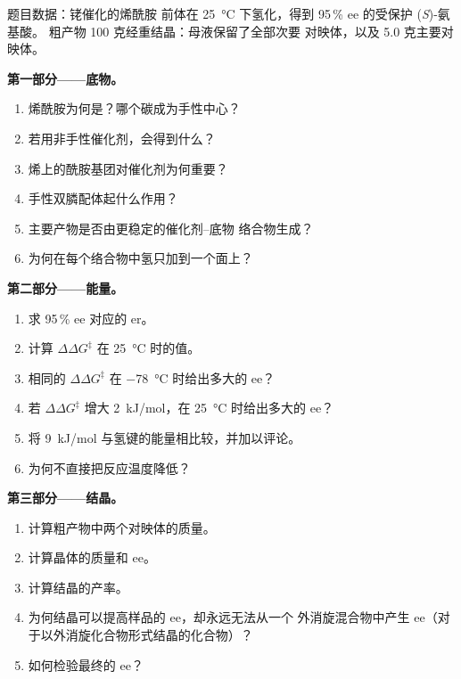 \begin{problem}
\label{pb:b3:asymmetric-synthesis:1}
题目数据：铑催化的烯酰胺
前体在 \qty{25}{\celsius} 下氢化，得到 95\,\% ee 的受保护 (\textit{S})-氨基酸。
粗产物 100 克经重结晶：母液保留了全部次要
对映体，以及 5.0 克主要对映体。

\medskip\noindent\textbf{第一部分——底物。}
\begin{enumerate}
  \item 烯酰胺为何是？哪个碳成为手性中心？
  \item 若用非手性催化剂，会得到什么？
  \item 烯上的酰胺基团对催化剂为何重要？
  \item 手性双膦配体起什么作用？
  \item 主要产物是否由更稳定的催化剂–底物
        络合物生成？
  \item 为何在每个络合物中氢只加到一个面上？
\end{enumerate}

\medskip\noindent\textbf{第二部分——能量。}
\begin{enumerate}[resume]
  \item 求 95\,\% ee 对应的 er。
  \item 计算 $\Delta\Delta G^\ddagger$ 在 \qty{25}{\celsius} 时的值。
  \item 相同的 $\Delta\Delta G^\ddagger$ 在 \qty{-78}{\celsius} 时给出多大的 ee？
  \item 若 $\Delta\Delta G^\ddagger$ 增大 \qty{2}{kJ/mol}，在 \qty{25}{\celsius} 时给出多大的 ee？
  \item 将 \qty{9}{kJ/mol} 与氢键的能量相比较，并加以评论。
  \item 为何不直接把反应温度降低？
\end{enumerate}

\medskip\noindent\textbf{第三部分——结晶。}
\begin{enumerate}[resume]
  \item 计算粗产物中两个对映体的质量。
  \item 计算晶体的质量和 ee。
  \item 计算结晶的产率。
  \item 为何结晶可以提高样品的 ee，却永远无法从一个
        外消旋混合物中产生 ee（对于以外消旋化合物形式结晶的化合物）？
  \item 如何检验最终的 ee？
\end{enumerate}


\end{problem}
